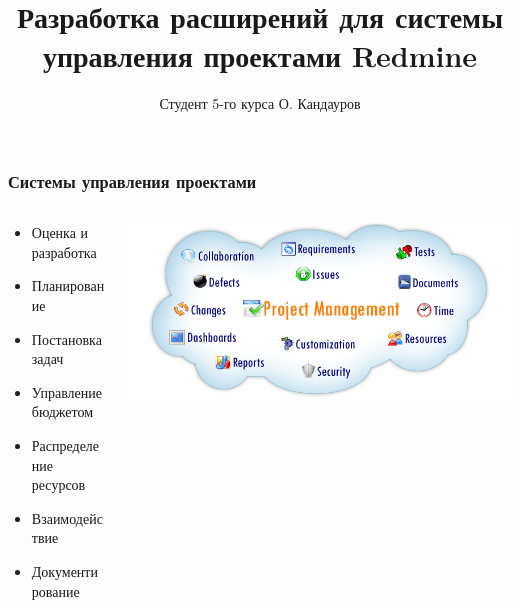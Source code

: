 \documentclass[unicode]{beamer}
\title[Расширение функционала системы управления проектами Redmine]{
Разработка расширений для системы управления проектами Redmine
}
\author[Кандауров О.\,В.]{Студент 5-го курса О. Кандауров}
\institute{
Научный руководитель: ст. преподаватель Парамонов~И.\,В.
}
\date{}
\begin{document}
\maketitle

\begin{frame}
\transwipe[direction=90]
\frametitle{Системы управления проектами}
\begin{columns}
\begin{column}{0.45\textwidth}
\begin{itemize}
  \item Оценка и разработка
  \item Планирование
  \item Постановка задач
  \item Управление бюджетом
  \item Распределение ресурсов
  \item Взаимодействие
  \item Документирование
\end{itemize}
\end{column}
\begin{column}{0.55\textwidth}
\centerline{\includegraphics[width=1\textwidth]{project-management-software.png}}
\end{column}
\end{columns}
\end{frame}
\end{document}
